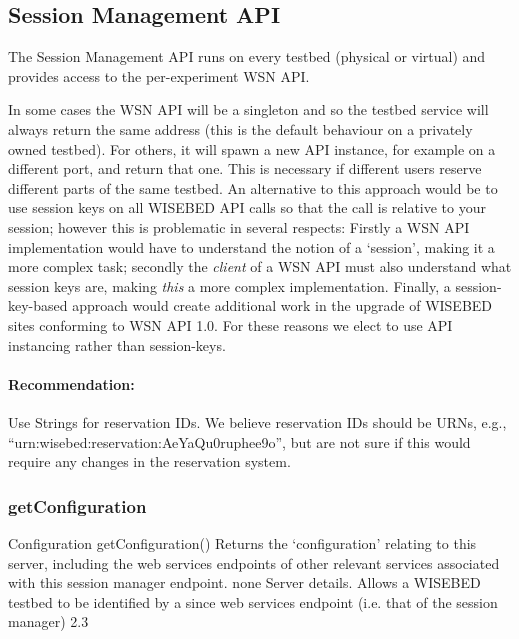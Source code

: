 		\subsection{Session Management API}
		\label{sec:smapi}
The Session Management API runs on every testbed (physical or virtual) and provides access to the per-experiment WSN API.

In some cases the WSN API will be a singleton and so the testbed service will always return the same address (this is the default behaviour on a privately owned testbed). For others, it will spawn a new API instance, for example on a different port, and return that one. This is necessary if different users reserve different parts of the same testbed. An alternative to this approach would be to use session keys on all WISEBED API calls so that the call is relative to your session; however this is problematic in several respects: Firstly a WSN API implementation would have to understand the notion of a `session', making it a more complex task; secondly the {\em client} of a WSN API must also understand what session keys are, making {\em this} a more complex implementation. Finally, a session-key-based approach would create additional work in the upgrade of WISEBED sites conforming to WSN API 1.0. For these reasons we elect to use API instancing rather than session-keys.

\paragraph{Recommendation:} Use Strings for reservation IDs. We believe reservation IDs should be URNs, e.g., ``urn:wisebed:reservation:AeYaQu0ruphee9o'', but are not sure if this would require any changes in the reservation system.

			\subsubsection{getConfiguration}

\begin{apidoc}
	{Configuration getConfiguration()} %
	{Returns the `configuration' relating to this server, including the web services endpoints of other relevant services associated with this session manager endpoint.} %
	{none} %
	{Server details. } %
	{Allows a WISEBED testbed to be identified by a since web services endpoint (i.e. that of the session manager)
	} %
	{2.3} %
\end{apidoc}

